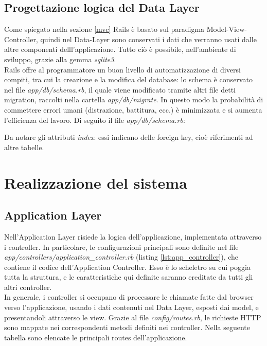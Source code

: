 \documentclass[Lau, binding=0.6cm, oneside]{sapthesis}
\begin{document}
\section{Progettazione logica del Data Layer}

Come spiegato nella sezione \ref{mvc} Rails è basato sul paradigma Model-View-Controller, quindi nel Data-Layer sono conservati i dati che verranno usati dalle altre componenti delll'applicazione. Tutto ciò è possibile, nell'ambiente di sviluppo, grazie alla gemma \textit{sqlite3}.\\
Rails offre al programmatore un buon livello di automatizzazione di diversi compiti, tra cui la creazione e la modifica del database: lo schema è conservato nel file \textit{app/db/schema.rb}, il quale viene modificato tramite altri file detti migration, raccolti nella cartella \textit{app/db/migrate}.
In questo modo la probabilità di commettere errori umani (distrazione, battitura, ecc.) è minimizzata e si aumenta l'efficienza del lavoro.
Di seguito il file \textit{app/db/schema.rb}:



Da notare gli attributi \textit{index}: essi indicano delle foreign key, cioè riferimenti ad altre tabelle.

\chapter{Realizzazione del sistema}

\section{Application Layer}

Nell'Application Layer risiede la logica dell'applicazione, implementata attraverso i controller. In particolare, le configurazioni principali sono definite nel file \textit{app/controllers/application\_controller.rb} (listing \ref{lst:app_controller}), che contiene il codice dell'Application Controller. Esso è lo scheletro su cui poggia tutta la struttura, e le caratteristiche qui definite saranno ereditate da tutti gli altri controller.\\
In generale, i controller si occupano di processare le chiamate fatte dal browser verso l'applicazione, usando i dati contenuti nel Data Layer, esposti dai model, e presentandoli attraverso le view. Grazie al file \textit{config/routes.rb}, le richieste HTTP sono mappate nei correspondenti metodi definiti nei controller. Nella seguente tabella sono elencate le principali routes dell'applicazione. 
\end{document}
